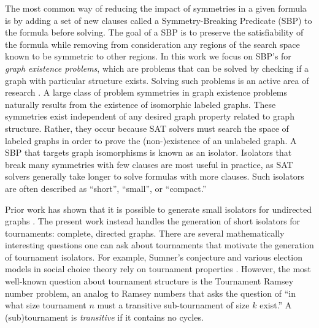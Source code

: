 \documentclass[conference]{IEEEtran}
\begin{document}
The most common way of reducing the impact of symmetries in a given formula is by adding a set of new clauses called a Symmetry-Breaking Predicate (SBP) to the formula before solving. The goal of a SBP is to preserve the satisfiability of the formula while removing from consideration any regions of the search space known to be symmetric to other regions. In this work we focus on SBP's for \emph{graph existence problems}, which are problems that can be solved by checking if a graph with particular structure exists. Solving such problems is an active area of research \cite{ref_vdw, ref_ramseyk, ref_5cycle}. A large class of problem symmetries in graph existence problems naturally results from the existence of isomorphic labeled graphs. These symmetries exist independent of any desired graph property related to graph structure. Rather, they occur because SAT solvers must search the space of labeled graphs in order to prove the (non-)existence of an unlabeled graph. A SBP that targets graph isomorphisms is known as an isolator. Isolators that break many symmetries with few clauses are most useful in practice, as SAT solvers generally take longer to solve formulas with more clauses. Such isolators are often described as ``short'', ``small'', or ``compact.''


Prior work has shown that it is possible to generate small isolators for undirected graphs \cite{ref_heule}. The present work instead handles the generation of short isolators for tournaments: complete, directed graphs. There are several mathematically interesting questions one can ask about tournaments that motivate the generation of tournament isolators. For example, Sumner's conjecture and various election models in social choice theory rely on tournament properties \cite{ref_sumner,ref_social_choice}. However, the most well-known question about tournament structure is the Tournament Ramsey number problem, an analog to Ramsey numbers \cite{ref_ramsey_survey} that asks the question of ``in what size tournament $n$ must a transitive sub-tournament of size $k$ exist.'' A (sub)tournament is \emph{transitive} if it contains no cycles.
\end{document}
